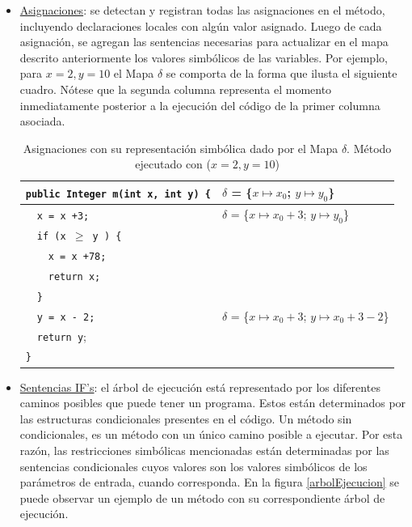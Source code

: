 \documentclass{llncs}
\begin{document}
\begin{itemize}
  \item \underline{Asignaciones}: se detectan y registran todas las asignaciones en el método, incluyendo declaraciones locales con algún valor asignado. Luego
  de cada asignación, se agregan las sentencias necesarias para actualizar en el mapa descrito anteriormente los valores simbólicos de las variables.
  Por ejemplo, para $x=2, y=10$ el Mapa $\delta$ se comporta de la forma que ilusta el siguiente cuadro. Nótese que la segunda columna representa el momento
  inmediatamente posterior a la ejecución del código de la primer columna asociada.
      \begin{table}
	\centering
	\begin{tabular}{|m{5.5cm} | m{5cm}|}
	  \hline
	  \texttt{public Integer m(int x, int y) \{}  & $\delta$ = \{$x \mapsto x_0$; $y \mapsto y_0$\}\\
	  \hline
	  \ \ \texttt{x = x +3;} 		      & $\delta$ = \{$x \mapsto x_0 + 3$; $y \mapsto y_0$\}\\
	  \hline
	  \ \ \texttt{if (x $\geq$ y ) \{}	      &  \\
	  \hline
	  \ \ \ \ \texttt{x = x +78;} 		      & \\
	  \hline
	  \ \ \ \ \texttt{return x;} 		      & \\
	  \hline
	  \ \ \texttt{\}} 			      & \\
	  \hline
	  \ \ \texttt{y = x - 2;} 		      & $\delta$ = \{$x \mapsto x_0 + 3$; $y \mapsto x_0 +3 - 2$\}\\
	  \hline
	  \ \ \texttt{return y}; 		      & \\
	  \hline
	  \texttt{\}} 				      & \\
	  \hline
	\end{tabular}
	\centering
	\caption{Asignaciones con su representación simbólica dado por el Mapa $\delta$. Método ejecutado con ($x=2, y=10$)}
      \end{table}

  \item \underline{Sentencias IF’s}: el árbol de ejecución está representado por los diferentes caminos posibles que puede tener un programa. Estos están determinados por las
  estructuras condicionales presentes en el código. Un método sin condicionales, es un método con un único camino posible a ejecutar. Por esta razón, las restricciones simbólicas
  mencionadas están determinadas por las sentencias condicionales cuyos valores son los valores simbólicos de los parámetros de entrada, cuando corresponda. En la figura
  \ref{arbolEjecucion} se puede observar un ejemplo de un método con su correspondiente árbol de ejecución.
  

\end{itemize}
\end{document}
